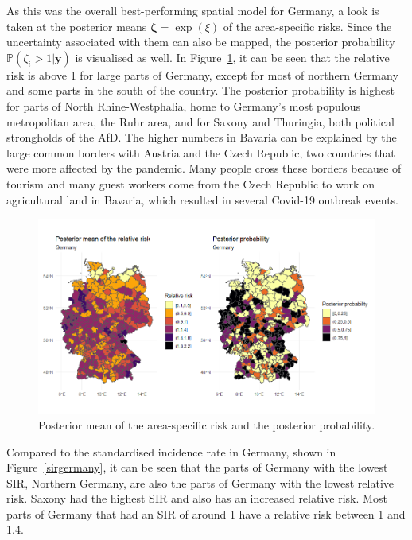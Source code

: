 As this was the overall best-performing spatial model for Germany, a look is taken at the posterior means $\pmb{\zeta} = \exp{\left(\xi\right)}$ of the area-specific risks. Since the uncertainty associated with them can also be mapped, the posterior probability $\mathbb{P}\left(\zeta_i > 1|\pmb{y}\right)$ is visualised as well. In Figure~\ref{posteriorGermany}, it can be seen that the relative risk is above 1 for large parts of Germany, except for most of northern Germany and some parts in the south of the country. The posterior probability is highest for parts of North Rhine-Westphalia, home to Germany's most populous metropolitan area, the Ruhr area, and for Saxony and Thuringia, both political strongholds of the AfD. The higher numbers in Bavaria can be explained by the large common borders with Austria and the Czech Republic, two countries that were more affected by the pandemic. Many people cross these borders because of tourism and many guest workers come from the Czech Republic to work on agricultural land in Bavaria, which resulted in several Covid-19 outbreak events.
\begin{figure}[H]
    \centering
    \includegraphics[width = \textwidth]{posterior_germany.png}
    \caption{Posterior mean of the area-specific risk and the posterior probability.}
    \label{posteriorGermany}
\end{figure}
%     
Compared to the standardised incidence rate in Germany, shown in Figure~\ref{sirgermany}, it can be seen that the parts of Germany with the lowest SIR, Northern Germany, are also the parts of Germany with the lowest relative risk. Saxony had the highest SIR and also has an increased relative risk. Most parts of Germany that had an SIR of around 1 have a relative risk between 1 and 1.4.
